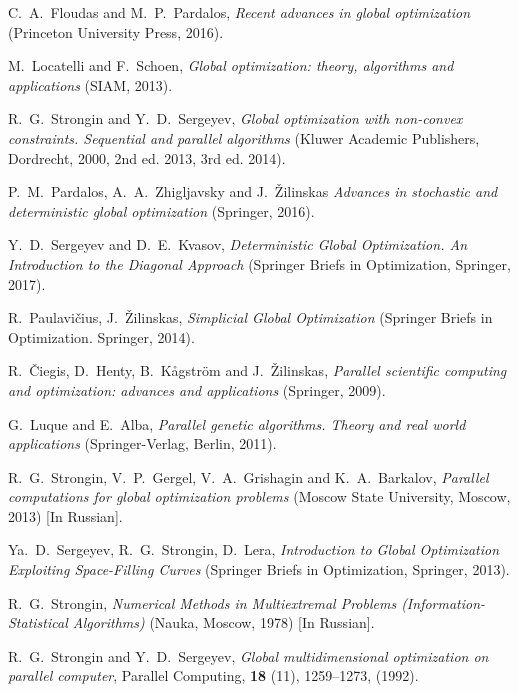 \documentclass[
11pt,%
tightenlines,%
twoside,%
onecolumn,%
nofloats,%
nobibnotes,%
nofootinbib,%
superscriptaddress,%
noshowpacs,%
centertags]%
{revtex4}
\begin{document}
\begin{thebibliography}{20}

C.~A.~Floudas and M.~P.~Pardalos, \textit{Recent advances in global optimization} (Princeton University Press, 2016).

M.~Locatelli and F.~Schoen, \textit{Global optimization: theory, algorithms and applications} (SIAM, 2013).

R.~G.~Strongin and Y.~D.~Sergeyev, \textit{Global optimization with non-convex constraints. Sequential and parallel algorithms} (Kluwer Academic Publishers, Dordrecht, 2000, 2nd ed. 2013, 3rd ed. 2014).

P.~M.~Pardalos, A.~A.~Zhigljavsky and J.~\v{Z}ilinskas \textit{Advances in stochastic and deterministic global optimization} (Springer, 2016).

Y.~D.~Sergeyev and D.~E.~Kvasov, \textit{Deterministic Global Optimization. An Introduction to the Diagonal Approach}  (Springer Briefs in Optimization, Springer, 2017).

R.~Paulavi\v{c}ius, J.~\v{Z}ilinskas, \textit{Simplicial Global Optimization} (Springer Briefs in Optimization. Springer, 2014).

R.~\v{C}iegis, D.~Henty, B.~K\r{a}gstr\"om and J.~\v{Z}ilinskas, \textit{Parallel scientific computing and optimization: advances and applications}  (Springer, 2009). 

G.~Luque and E.~Alba, \textit{Parallel genetic algorithms. Theory and real world applications} (Springer-Verlag, Berlin, 2011).

R.~G.~Strongin, V.~P.~Gergel, V.~A.~Grishagin and K.~A.~Barkalov, \textit{Parallel computations for global optimization problems} (Moscow State University, Moscow, 2013) [In Russian].

Ya.~D.~Sergeyev, R.~G.~Strongin, D.~Lera, \textit{Introduction to Global Optimization Exploiting Space-Filling Curves} (Springer Briefs in Optimization, Springer, 2013).

R.~G.~Strongin, \textit{Numerical Methods in Multiextremal Problems (Information-Statistical Algorithms)} (Nauka, Moscow, 1978) [In Russian].

R.~G.~Strongin and Y.~D.~Sergeyev, \textit{Global multidimensional optimization on parallel computer}, Parallel Computing, \textbf{18} (11), 1259--1273, (1992).


\end{thebibliography}
\end{document}
